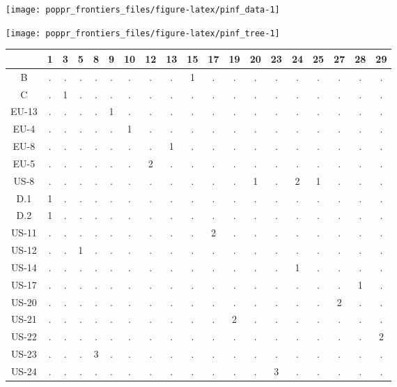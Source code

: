 \documentclass{frontiersSCNS} %
\newenvironment{CodeChunk}{}{}
\begin{document}
\begin{CodeChunk}

\texttt{[image: poppr\_frontiers\_files/figure-latex/pinf\_data-1]} \end{CodeChunk}\begin{CodeChunk}

\texttt{[image: poppr\_frontiers\_files/figure-latex/pinf\_tree-1]} \end{CodeChunk}\begin{table}[ht]
\centering
\begin{tabular}{ccccccccccccccccccc}
  \hline
 & 1 & 3 & 5 & 8 & 9 & 10 & 12 & 13 & 15 & 17 & 19 & 20 & 23 & 24 & 25 & 27 & 28 & 29 \\ 
  \hline
B & . & . & . & . & . & . & . & . & 1 & . & . & . & . & . & . & . & . & . \\ 
  C & . & 1 & . & . & . & . & . & . & . & . & . & . & . & . & . & . & . & . \\ 
  EU-13 & . & . & . & . & 1 & . & . & . & . & . & . & . & . & . & . & . & . & . \\ 
  EU-4 & . & . & . & . & . & 1 & . & . & . & . & . & . & . & . & . & . & . & . \\ 
  EU-8 & . & . & . & . & . & . & . & 1 & . & . & . & . & . & . & . & . & . & . \\ 
  EU-5 & . & . & . & . & . & . & 2 & . & . & . & . & . & . & . & . & . & . & . \\ 
  US-8 & . & . & . & . & . & . & . & . & . & . & . & 1 & . & 2 & 1 & . & . & . \\ 
  D.1 & 1 & . & . & . & . & . & . & . & . & . & . & . & . & . & . & . & . & . \\ 
  D.2 & 1 & . & . & . & . & . & . & . & . & . & . & . & . & . & . & . & . & . \\ 
  US-11 & . & . & . & . & . & . & . & . & . & 2 & . & . & . & . & . & . & . & . \\ 
  US-12 & . & . & 1 & . & . & . & . & . & . & . & . & . & . & . & . & . & . & . \\ 
  US-14 & . & . & . & . & . & . & . & . & . & . & . & . & . & 1 & . & . & . & . \\ 
  US-17 & . & . & . & . & . & . & . & . & . & . & . & . & . & . & . & . & 1 & . \\ 
  US-20 & . & . & . & . & . & . & . & . & . & . & . & . & . & . & . & 2 & . & . \\ 
  US-21 & . & . & . & . & . & . & . & . & . & . & 2 & . & . & . & . & . & . & . \\ 
  US-22 & . & . & . & . & . & . & . & . & . & . & . & . & . & . & . & . & . & 2 \\ 
  US-23 & . & . & . & 3 & . & . & . & . & . & . & . & . & . & . & . & . & . & . \\ 
  US-24 & . & . & . & . & . & . & . & . & . & . & . & . & 3 & . & . & . & . & . \\ 
   \hline
\end{tabular}
\end{table}
\end{document}
